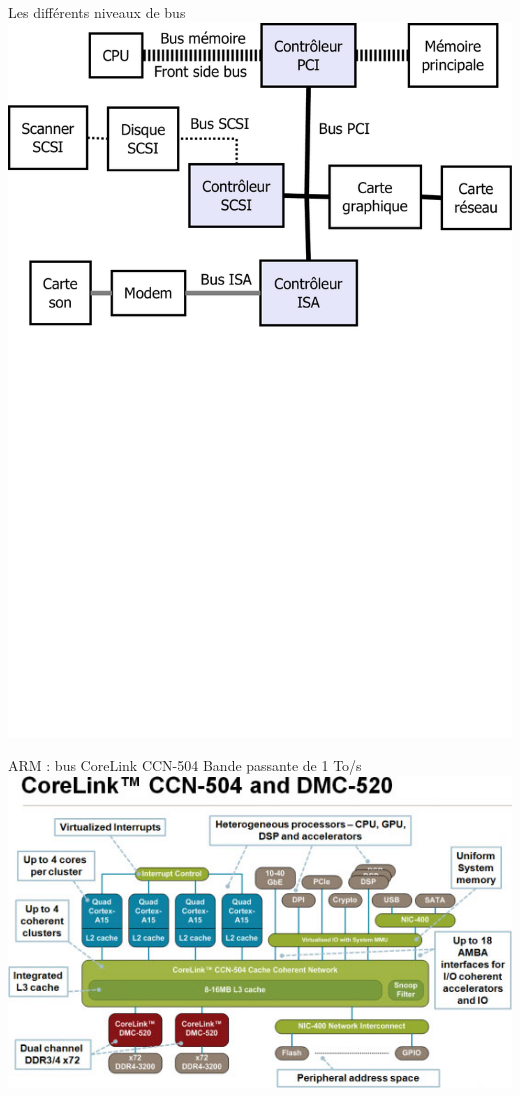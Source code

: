 \begin{frame}{Les différents niveaux de bus}
\includegraphics[width=.9\textwidth]{../illustration/NiveauxBus.pdf}
\end{frame}


\begin{frame}{ARM : bus CoreLink CCN-504}
Bande passante de 1 To/s \cite{xbits}
\includegraphics[width=.8\textwidth]{../illustration/arm504.jpg}
\end{frame}

